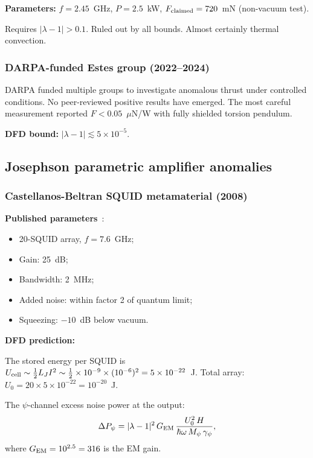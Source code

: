 \documentclass[12pt,aps,prd,twocolumn,superscriptaddress,nofootinbib]{revtex4-2}
\newcommand{\gpsi}{\gamma_\psi}
\newcommand{\Mpsi}{M_\psi}
\newcommand{\half}{\tfrac{1}{2}}
\begin{document}
\textbf{Parameters:} $f = 2.45$~GHz, $P = 2.5$~kW,
$F_{\rm claimed} = 720$~mN (non-vacuum test).

Requires $|\lambda-1| > 0.1$.  Ruled out by all bounds.
Almost certainly thermal convection.

\subsubsection{DARPA-funded Estes group (2022--2024)}
\label{sec:darpa}

DARPA funded multiple groups to investigate anomalous thrust
under controlled conditions. No peer-reviewed positive results
have emerged. The most careful measurement reported
$F < 0.05$~$\mu$N/W with fully shielded torsion pendulum.

\textbf{DFD bound:} $|\lambda-1| \lesssim 5\times10^{-5}$.

\subsection{Josephson parametric amplifier anomalies}

\subsubsection{Castellanos-Beltran SQUID metamaterial (2008)}
\label{sec:castellanos}

\textbf{Published parameters}~\cite{CastellanosBeltran2008}:
\begin{itemize}[noitemsep]
\item 20-SQUID array, $f = 7.6$~GHz;
\item Gain: 25~dB;
\item Bandwidth: 2~MHz;
\item Added noise: within factor 2 of quantum limit;
\item Squeezing: $-10$~dB below vacuum.
\end{itemize}

\textbf{DFD prediction:}

The stored energy per SQUID is $U_{\rm cell} \sim \half L_J I^2
\sim \half\times10^{-9}\times(10^{-6})^2 = 5\times10^{-22}$~J.
Total array: $U_0 = 20\times5\times10^{-22} = 10^{-20}$~J.

The $\psi$-channel excess noise power at the output:
\begin{equation}
\Delta P_\psi = |\lambda-1|^2\,G_{\rm EM}\,\frac{U_0^2\,H}
{\hbar\omega\,\Mpsi\,\gpsi},
\label{eq:jpa_noise}
\end{equation}
where $G_{\rm EM} = 10^{2.5} = 316$ is the EM gain.
\end{document}

